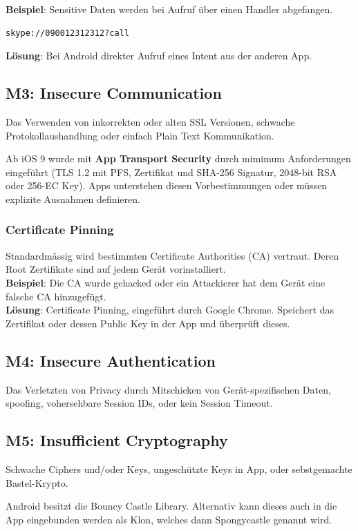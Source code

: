 \textbf{Beispiel}: Sensitive Daten werden bei Aufruf über einen Handler abgefangen.
\begin{lstlisting}[language=XML, caption=Aufruf von Skype]
skype://090012312312?call
\end{lstlisting}

\textbf{Lösung}: Bei Android direkter Aufruf eines Intent aus der anderen App.

\subsection{M3: Insecure Communication}
Das Verwenden von inkorrekten oder alten SSL Versionen, schwache Protokollaushandlung oder einfach Plain Text Kommunikation.

Ab iOS 9 wurde mit \textbf{App Transport Security} durch mimimum Anforderungen eingeführt (TLS 1.2 mit PFS, Zertifikat und SHA-256 Signatur, 2048-bit RSA oder 256-EC Key). Apps unterstehen diesen Vorbestimmungen oder müssen explizite Ausnahmen definieren.

\subsubsection{Certificate Pinning}
Standardmässig wird bestimmten Certificate Authorities (CA) vertraut. Deren Root Zertifikate sind auf jedem Gerät vorinstalliert.\\

\textbf{Beispiel}: Die CA wurde gehacked oder ein Attackierer hat dem Gerät eine falsche CA hinzugefügt. \\

\textbf{Lösung}: Certificate Pinning, eingeführt durch Google Chrome. Speichert das Zertifikat oder dessen Public Key in der App und überprüft dieses.

\subsection{M4: Insecure Authentication}
Das Verletzten von Privacy durch Mitschicken von Gerät-spezifischen Daten, spoofing, vohersehbare Session IDs, oder kein Session Timeout.

\subsection{M5: Insufficient Cryptography}
Schwache Ciphers und/oder Keys, ungeschützte Keys in App, oder sebstgemachte Bastel-Krypto.

Android besitzt die Bouncy Castle Library. Alternativ kann dieses auch in die App eingebunden werden als Klon, welches dann Spongycastle genannt wird.

